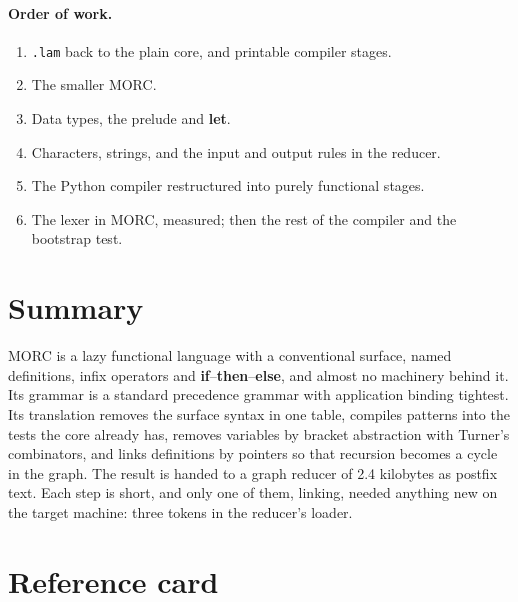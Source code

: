 \documentclass[11pt,a4paper]{article}
\theoremstyle{definition}
\theoremstyle{plain}
\newcommand{\kw}[1]{\textbf{#1}}
\begin{document}
\paragraph{Order of work.}
\begin{enumerate}
\item \texttt{.lam} back to the plain core, and printable compiler stages.
\item The smaller MORC.
\item Data types, the prelude and \kw{let}.
\item Characters, strings, and the input and output rules in the reducer.
\item The Python compiler restructured into purely functional stages.
\item The lexer in MORC, measured; then the rest of the compiler and the
  bootstrap test.
\end{enumerate}

\section{Summary}

MORC is a lazy functional language with a conventional surface, named
definitions, infix operators and \kw{if}--\kw{then}--\kw{else}, and almost
no machinery behind it. Its grammar is a standard precedence grammar with
application binding tightest. Its translation removes the surface syntax in
one table, compiles patterns into the tests the core already has, removes variables by bracket abstraction with Turner's
combinators, and links definitions by pointers so that recursion becomes a
cycle in the graph. The result is handed to a graph reducer of 2.4 kilobytes
as postfix text. Each step is short, and only one of them, linking, needed
anything new on the target machine: three tokens in the reducer's loader.

\appendix
\section{Reference card}\label{sec:card}
\end{document}
